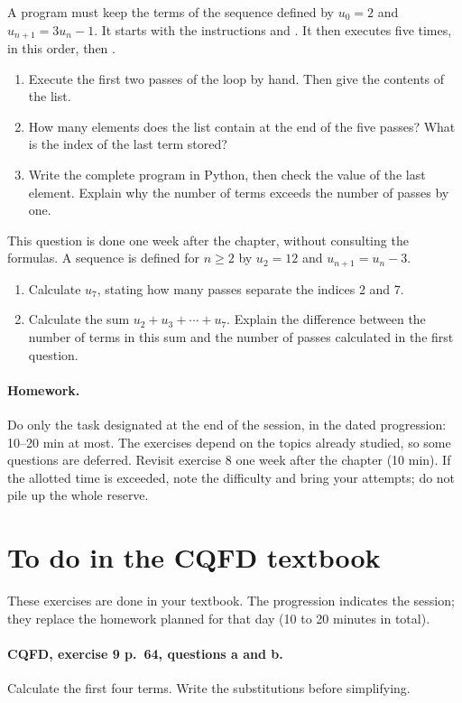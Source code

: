 A program must keep the terms of the sequence defined by $u_0=2$ and $u_{n+1}=3u_n-1$. It starts with the instructions  and . It then executes five times, in this order,  then .
\begin{enumerate}[label=\arabic*.]
\item Execute the first two passes of the loop by hand. Then give the contents of the list.
\item How many elements does the list contain at the end of the five passes? What is the index of the last term stored?
\item Write the complete program in Python, then check the value of the last element. Explain why the number of terms exceeds the number of passes by one.
\end{enumerate}
This question is done one week after the chapter, without consulting the formulas. A sequence is defined for $n\geq2$ by $u_2=12$ and $u_{n+1}=u_n-3$.
\begin{enumerate}[label=\arabic*.]
\item Calculate $u_7$, stating how many passes separate the indices 2 and 7.
\item Calculate the sum $u_2+u_3+\cdots+u_7$. Explain the difference between the number of terms in this sum and the number of passes calculated in the first question.
\end{enumerate}
\paragraph{Homework.} Do only the task designated at the end of the session, in the dated progression: 10--20 min at most. The exercises depend on the topics already studied, so some questions are deferred. Revisit exercise 8 one week after the chapter (10 min). If the allotted time is exceeded, note the difficulty and bring your attempts; do not pile up the whole reserve.
\endgroup
{}\section*{To do in the CQFD textbook}
These exercises are done in your textbook. The progression indicates the session; they replace the homework planned for that day (10 to 20 minutes in total).
\paragraph{CQFD, exercise 9 p.~64, questions a and b.}\label{C01-M1} Calculate the first four terms. Write the substitutions before simplifying.
